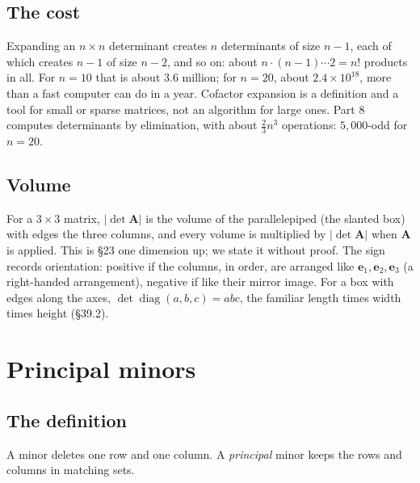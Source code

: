 \documentclass[11pt]{article}
\theoremstyle{plain}
\theoremstyle{definition}
\theoremstyle{remark}
\newcommand{\vc}[1]{\mathbf{#1}}
\newcommand{\mt}[1]{\mathbf{#1}}
\DeclareMathOperator{\diagop}{diag}
\begin{document}
\subsection{The cost}
Expanding an $n\times n$ determinant creates $n$ determinants of size $n-1$,
each of which creates $n-1$ of size $n-2$, and so on: about
$n\cdot(n-1)\cdots2=n!$ products in all. For $n=10$ that is about $3.6$ million;
for $n=20$, about $2.4\times10^{18}$, more than a fast computer can do in a
year. Cofactor expansion is a definition and a tool for small or sparse
matrices, not an algorithm for large ones. Part 8 computes determinants by
elimination, with about $\tfrac23n^{3}$ operations: $5{,}000$-odd for $n=20$.

\subsection{Volume}
For a $3\times3$ matrix, $|\det\mt{A}|$ is the volume of the parallelepiped (the
slanted box) with edges the three columns, and every volume is multiplied by
$|\det\mt{A}|$ when $\mt{A}$ is applied. This is \S23 one dimension up; we state
it without proof. The sign records orientation: positive if the columns, in
order, are arranged like $\vc{e}_1,\vc{e}_2,\vc{e}_3$ (a right-handed
arrangement), negative if like their mirror image. For a box with edges along
the axes,
$\det\diagop(a,b,c)=abc$, the familiar length times width times height
(\S39.2).

\section{Principal minors}

\subsection{The definition}
A minor deletes one row and one column. A \emph{principal} minor keeps the rows
and columns in matching sets.
\end{document}
